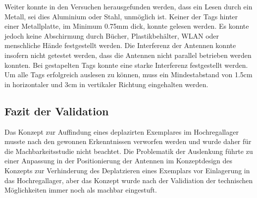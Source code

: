 Weiter konnte in den Versuchen herausgefunden werden, dass ein Lesen durch ein Metall, sei dies Aluminium oder Stahl, unmöglich ist. Keiner der Tags hinter einer Metallplatte, im Minimum 0.75mm dick, konnte gelesen werden. Es konnte jedoch keine Abschirmung durch Bücher, Plastikbehälter, WLAN oder menschliche Hände festgestellt werden. Die Interferenz der Antennen konnte insofern nicht getestet werden, dass die Antennen nicht parallel betrieben werden konnten. Bei gestapelten Tags konnte eine starke Interferenz festgestellt werden. Um alle Tags erfolgreich auslesen zu können, muss ein Mindestabstand von 1.5cm in horizontaler und 3cm in vertikaler Richtung eingehalten werden.

\subsection{Fazit der Validation}
Das Konzept zur Auffindung eines deplazirten Exemplares im Hochregallager musste nach den gewonnen Erkenntnissen verworfen werden und wurde daher für die Machbarkeitsstudie nicht beachtet. Die Problematik der Auslenkung führte zu einer Anpassung in der Positionierung der Antennen im Konzeptdesign des Konzepts zur Verhinderung des Deplatzieren eines Exemplars vor Einlagerung in das Hochregallager, aber das Konzept wurde nach der Validiation der technischen Möglichkeiten immer noch als machbar eingestuft.